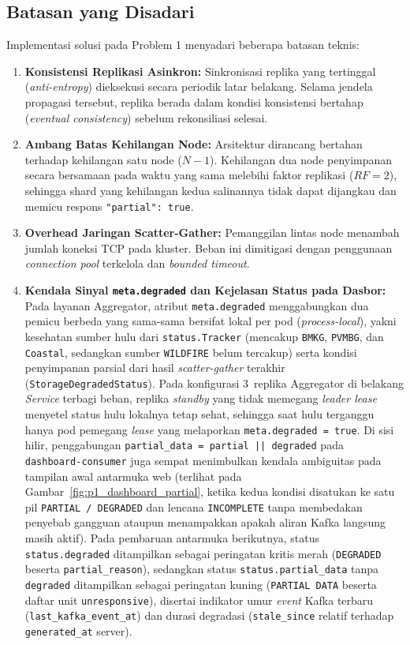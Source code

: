 \subsection{Batasan yang Disadari}
Implementasi solusi pada Problem 1 menyadari beberapa batasan teknis:
\begin{enumerate}
    \item \textbf{Konsistensi Replikasi Asinkron:} Sinkronisasi replika yang tertinggal (\textit{anti-entropy}) dieksekusi secara periodik latar belakang. Selama jendela propagasi tersebut, replika berada dalam kondisi konsistensi bertahap (\textit{eventual consistency}) sebelum rekonsiliasi selesai.
    \item \textbf{Ambang Batas Kehilangan Node:} Arsitektur dirancang bertahan terhadap kehilangan satu node ($N-1$). Kehilangan dua node penyimpanan secara bersamaan pada waktu yang sama melebihi faktor replikasi ($RF=2$), sehingga shard yang kehilangan kedua salinannya tidak dapat dijangkau dan memicu respons \texttt{"partial": true}.
    \item \textbf{Overhead Jaringan Scatter-Gather:} Pemanggilan lintas node menambah jumlah koneksi TCP pada kluster. Beban ini dimitigasi dengan penggunaan \textit{connection pool} terkelola dan \textit{bounded timeout}.
    \item \textbf{Kendala Sinyal \texttt{meta.degraded} dan Kejelasan Status pada Dasbor:} Pada layanan Aggregator, atribut \texttt{meta.degraded} menggabungkan dua pemicu berbeda yang sama-sama bersifat lokal per pod (\textit{process-local}), yakni kesehatan sumber hulu dari \texttt{status.\allowbreak Tracker} (mencakup \texttt{BMKG}, \texttt{PVMBG}, dan \texttt{Coastal}, sedangkan sumber \texttt{WILDFIRE} belum tercakup) serta kondisi penyimpanan parsial dari hasil \textit{scatter-gather} terakhir (\texttt{Storage\allowbreak Degraded\allowbreak Status}). Pada konfigurasi 3~replika Aggregator di belakang \textit{Service} terbagi beban, replika \textit{standby} yang tidak memegang \textit{leader lease} menyetel status hulu lokalnya tetap sehat, sehingga saat hulu terganggu hanya pod pemegang \textit{lease} yang melaporkan \texttt{meta.degraded = true}. Di sisi hilir, penggabungan \texttt{partial\_\allowbreak data = partial || degraded} pada \texttt{dashboard-consumer} juga sempat menimbulkan kendala ambiguitas pada tampilan awal antarmuka web (terlihat pada Gambar~\ref{fig:p1_dashboard_partial}, ketika kedua kondisi disatukan ke satu pil \texttt{PARTIAL / DEGRADED} dan lencana \texttt{INCOMPLETE} tanpa membedakan penyebab gangguan ataupun menampakkan apakah aliran Kafka langsung masih aktif). Pada pembaruan antarmuka berikutnya, status \texttt{status.\allowbreak degraded} ditampilkan sebagai peringatan kritis merah (\texttt{DEGRADED} beserta \texttt{partial\_\allowbreak reason}), sedangkan status \texttt{status.\allowbreak partial\_\allowbreak data} tanpa \texttt{degraded} ditampilkan sebagai peringatan kuning (\texttt{PARTIAL DATA} beserta daftar unit \texttt{unresponsive}), disertai indikator umur \textit{event} Kafka terbaru (\texttt{last\_\allowbreak kafka\_\allowbreak event\_at}) dan durasi degradasi (\texttt{stale\_\allowbreak since} relatif terhadap \texttt{generated\_at} server).
\end{enumerate}

